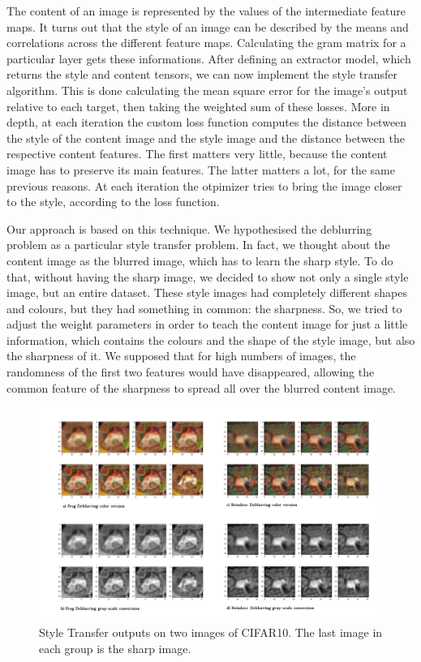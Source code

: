\documentclass[12pt,a4paper]{report}
\begin{document}
The content of an image is represented by the values of the intermediate feature maps. It turns out that the style of an image can be described by the means and correlations across the different feature maps. Calculating the gram matrix for a particular layer gets these informations.
After defining an extractor model, which returns the style and content tensors, we can now implement the style transfer algorithm. This is done calculating the mean square error for the image's output relative to each target, then taking the weighted sum of these losses. More in depth, at each iteration the custom loss function computes the distance between the style of the content image and the style image and the distance between the respective content features. The first matters very little, because the content image has to preserve its main features. The latter matters a lot, for the same previous reasons. At each iteration the otpimizer tries to bring the image closer to the style, according to the loss function.

Our approach is based on this technique. We hypothesised the deblurring problem as a particular style transfer problem. In fact, we thought about the content image as the blurred image, which has to learn the sharp style. To do that, without having the sharp image, we decided to show not only a single style image, but an entire dataset. These style images had completely different shapes and colours, but they had something in common: the sharpness. So, we tried to adjust the weight parameters in order to teach the content image for just a little information, which contains the colours and the shape of the style image, but also the sharpness of it. We supposed that for high numbers of images, the randomness of the first two features would have disappeared, allowing the common feature of the sharpness to spread all over the blurred content image.
\begin{figure}[hptb]
\centering
\includegraphics[scale=0.1]{style_outputs.png} 
\caption{Style Transfer outputs on two images of CIFAR10. The last image in each group is the sharp image.}
\label{style_outputs}
\end{figure}
\end{document}
